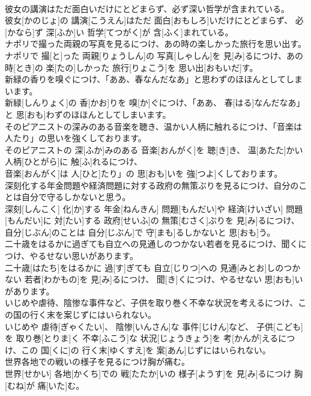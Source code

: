 \documentclass[8pt]{extreport}
\begin{document}
\begin{CJK}{UTF8}{min}
\\	彼女の講演はただ面白いだけにとどまらず、必ず深い哲学が含まれている。	
\\	彼女[かのじょ]の 講演[こうえん]はただ 面白[おもしろ]いだけにとどまらず、 必[かなら]ず 深[ふか]い 哲学[てつがく]が 含[ふく]まれている。
\\	ナポリで撮った両親の写真を見るにつけ、あの時の楽しかった旅行を思い出す。	
\\	ナポリで 撮[と]った 両親[りょうしん]の 写真[しゃしん]を 見[み]るにつけ、あの 時[とき]の 楽[たの]しかった 旅行[りょこう]を 思い出[おもいだ]す。
\\	新緑の香りを嗅ぐにつけ、「ああ、春なんだなあ」と思わずのほほんとしてしまいます。	
\\	新緑[しんりょく]の 香[かお]りを 嗅[か]ぐにつけ、「ああ、 春[はる]なんだなあ」と 思[おも]わずのほほんとしてしまいます。
\\	そのピアニストの深みのある音楽を聴き、温かい人柄に触れるにつけ、「音楽は人たり」の思いを強くしております。	
\\	そのピアニストの 深[ふか]みのある 音楽[おんがく]を 聴[き]き、 温[あたた]かい 人柄[ひとがら]に 触[ふ]れるにつけ、
\\	音楽[おんがく]は 人[ひと]たり」の 思[おも]いを 強[つよ]くしております。
\\	深刻化する年金問題や経済問題に対する政府の無策ぶりを見るにつけ、自分のことは自分で守るしかないと思う。	
\\	深刻[しんこく] 化[か]する 年金[ねんきん] 問題[もんだい]や 経済[けいざい] 問題[もんだい]に 対[たい]する 政府[せいふ]の 無策[むさく]ぶりを 見[み]るにつけ、 自分[じぶん]のことは 自分[じぶん]で 守[まも]るしかないと 思[おも]う。
\\	二十歳をはるかに過ぎても自立への見通しのつかない若者を見るにつけ、聞くにつけ、やるせない思いがあります。	
\\	二十歳[はたち]をはるかに 過[す]ぎても 自立[じりつ]への 見通[みとお]しのつかない 若者[わかもの]を 見[み]るにつけ、 聞[き]くにつけ、やるせない 思[おも]いがあります。
\\	いじめや虐待、陰惨な事件など、子供を取り巻く不幸な状況を考えるにつけ、この国の行く末を案じずにはいられない。	
\\	いじめや 虐待[ぎゃくたい]、 陰惨[いんさん]な 事件[じけん]など、 子供[こども]を 取り巻[とりま]く 不幸[ふこう]な 状況[じょうきょう]を 考[かんが]えるにつけ、この 国[くに]の 行く末[ゆくすえ]を 案[あん]じずにはいられない。
\\	世界各地での戦いの様子を見るにつけ胸が痛む。	
\\	世界[せかい] 各地[かくち]での 戦[たたか]いの 様子[ようす]を 見[み]るにつけ 胸[むね]が 痛[いた]む。

\end{CJK}
\end{document}
